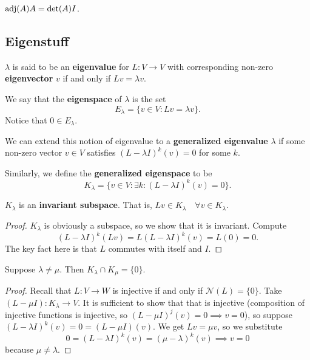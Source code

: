 \begin{thm}
$\operatorname{adj}(A) A = \det(A) I$.
\end{thm}

\subsection{Eigenstuff}

\begin{df}
$\lambda$ is said to be an \textbf{eigenvalue} for $L : V \rightarrow V$
with corresponding non-zero \textbf{eigenvector} $v$ if and only if $Lv
= \lambda v$.
\end{df}

\begin{df}
We say that the \textbf{eigenspace} of $\lambda$ is the set
\[ E_{\lambda} = \lbrace v \in V : Lv = \lambda v \rbrace. \]
Notice that $0 \in E_{\lambda}$.
\end{df}

\begin{df}
We can extend this notion of eigenvalue to a \textbf{generalized
eigenvalue} $\lambda$ if some non-zero vector $v \in V$ satisfies $(L -
\lambda I)^k (v) = 0$ for some $k$.
\end{df}

\begin{df}
Similarly, we define the \textbf{generalized eigenspace} to be
\[ K_{\lambda} = \lbrace v \in V : \exists k : (L - \lambda I)^k (v) = 0
\rbrace. \]
\end{df}

\begin{prop}
$K_{\lambda}$ is an \textbf{invariant subspace}. That is, $Lv \in
K_{\lambda} \quad \forall v \in K_{\lambda}$.
\end{prop}

\begin{proof}
$K_{\lambda}$ is obviously a subspace, so we show that it is invariant.
Compute
\[ (L - \lambda I)^k (Lv) = L (L - \lambda I)^k (v) = L(0) = 0. \]
The key fact here is that $L$ commutes with itself and $I$.
\end{proof}

\begin{prop}
Suppose $\lambda \neq \mu$. Then $K_{\lambda} \cap K_{\mu} = \lbrace 0
\rbrace$.
\end{prop}

\begin{proof}
Recall that $L : V \rightarrow W$ is injective if and only if
$\mathcal{N}(L) = \lbrace 0 \rbrace$. Take $(L - \mu I) : K_{\lambda}
\rightarrow V$. It is sufficient to show that that is injective
(composition of injective functions is injective, so $(L - \mu I)^j (v)
= 0 \implies v = 0$), so suppose $(L - \lambda I)^k (v) = 0 = (L - \mu
I)(v)$. We get $Lv = \mu v$, so we substitute
\[ 0 = (L - \lambda I)^k (v) = (\mu - \lambda)^k (v) \implies v = 0 \]
because $\mu \neq \lambda$.
\end{proof}


